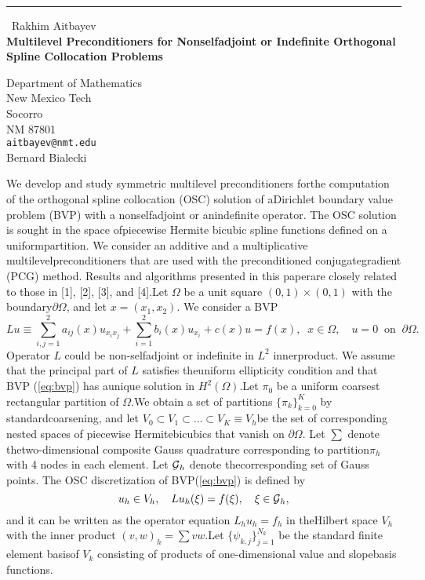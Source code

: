 \documentclass{report}
\begin{document}
\begin{center}
\rule{6in}{1pt} \
{\large Rakhim Aitbayev \\
{\bf Multilevel Preconditioners for Nonselfadjoint or Indefinite Orthogonal Spline Collocation Problems }}

Department of Mathematics \\ New Mexico Tech \\ Socorro \\ NM 87801
\\
{\tt aitbayev@nmt.edu}\\
 Bernard  Bialecki \end{center}

\newcommand{\GP}{\mbox{${\cal G}$}}\newcommand{\SH}{\mbox{$\scriptscriptstyle H^{2}(\Omega)$}}\newcommand{\SL}{\mbox{$\scriptscriptstyle L^{2}(\Omega)$}}We develop and study symmetric multilevel preconditioners forthe computation of the orthogonal spline collocation (OSC) solution of aDirichlet boundary value problem (BVP) with a nonselfadjoint or anindefinite operator.
The OSC solution is sought in the space ofpiecewise Hermite bicubic spline functions defined on a uniformpartition.
We consider an additive and a multiplicative multilevelpreconditioners that are used with the preconditioned conjugategradient (PCG) method.
Results and algorithms presented in this paperare closely related to those in [1],
[2],
[3],
and [4].Let $\Omega$ be a unit square $(0,1)\times(0,1)$ with the boundary$\partial\Omega$,
and let $x=(x_1,x_2)$.
We consider a BVP\begin{equation}\label{eq:bvp}Lu\equiv\sum_{i,j=1}^{2} a_{ij}(x)u_{x_ix_j}+\sum_{i=1}^{2} b_i(x)u_{x_i} +c(x)u = f(x),\;\;x\in\Omega,\quad u=0 \;\;\mbox{on}\;\;\partial\Omega.\end{equation}Operator $L$ could be non-selfadjoint or indefinite in $L^2$ innerproduct.
We assume that the principal part of $L$ satisfies theuniform ellipticity condition and that BVP (\ref{eq:bvp}) has aunique solution in $H^2(\Omega)$.Let $\pi_0$ be a uniform coarsest rectangular partition of $\Omega$.We obtain a set of partitions $\{\pi_k\}_{k=0}^{K}$ by standardcoarsening,
and let $V_0\subset V_1\subset\ldots\subset V_K\equiv V_h$be the set of corresponding nested spaces of piecewise Hermitebicubics that vanish on $\partial\Omega$.
Let $\sum$ denote thetwo-dimensional composite Gauss quadrature corresponding to partition$\pi_h$ with 4 nodes in each element.
Let $\GP_h$ denote thecorresponding set of Gauss points.
The OSC discretization of BVP(\ref{eq:bvp}) is defined by\begin{equation}\label{eq:osc}u_h\in V_h,\quad Lu_h(\xi)=f(\xi),\quad\xi\in\GP_h,\end{equation}and it can be written as the operator equation $L_hu_h=f_h$ in theHilbert space $V_h$ with the inner product $(v,w)_h=\sum vw$.Let $\{\psi_{k,j}\}_{j=1}^{N_k}$ be the standard finite element basisof $V_k$ consisting of products of one-dimensional value and slopebasis functions.
\end{document}
